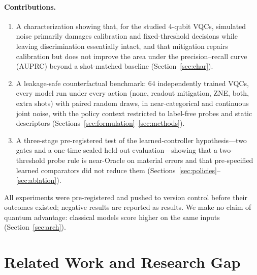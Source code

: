 \documentclass[11pt]{article}
\begin{document}
\paragraph{Contributions.}
\begin{enumerate}
\item A characterization showing that, for the studied 4-qubit VQCs, simulated noise primarily damages calibration and fixed-threshold decisions while leaving discrimination essentially intact, and that mitigation repairs calibration but does not improve the area under the precision--recall curve (AUPRC) beyond a shot-matched baseline (Section~\ref{sec:char}).
\item A leakage-safe counterfactual benchmark: 64 independently trained VQCs, every model run under every action (none, readout mitigation, ZNE, both, extra shots) with paired random draws, in near-categorical and continuous joint noise, with the policy context restricted to label-free probes and static descriptors (Sections~\ref{sec:formulation}--\ref{sec:methods}).
\item A three-stage pre-registered test of the learned-controller hypothesis---two gates and a one-time sealed held-out evaluation---showing that a two-threshold probe rule is near-Oracle on material errors and that pre-specified learned comparators did not reduce them (Sections~\ref{sec:policies}--\ref{sec:ablation}).
\end{enumerate}
All experiments were pre-registered and pushed to version control before their outcomes existed; negative results are reported as results.
We make no claim of quantum advantage: classical models score higher on the same inputs (Section~\ref{sec:arch}).

\section{Related Work and Research Gap}
\label{sec:related}
\end{document}
